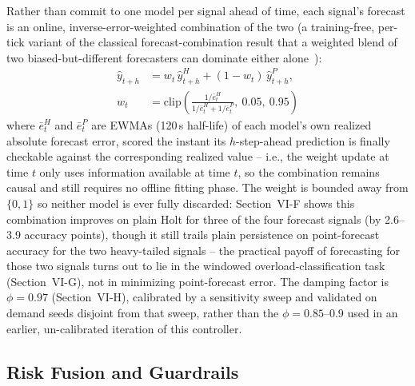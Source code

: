 \documentclass[conference]{IEEEtran}
\begin{document}
Rather than commit to one model per signal ahead of time, each signal's forecast is an online,
inverse-error-weighted combination of the two (a training-free, per-tick variant of the classical
forecast-combination result that a weighted blend of two biased-but-different forecasters can dominate
either alone~\cite{gardner1985}):
\begin{align}
\hat{y}_{t+h} &= w_t\, \hat{y}^{H}_{t+h} + (1-w_t)\, \hat{y}^{P}_{t+h}, \\
w_t &= \mathrm{clip}\!\left(\frac{1/\bar e^{H}_t}{1/\bar e^{H}_t + 1/\bar e^{P}_t},\ 0.05,\ 0.95\right)
\end{align}
where $\bar e^{H}_t$ and $\bar e^{P}_t$ are EWMAs (120\,s half-life) of each model's own realized
absolute forecast error, scored the instant its $h$-step-ahead prediction is finally checkable against
the corresponding realized value -- i.e., the weight update at time $t$ only uses information available
at time $t$, so the combination remains causal and still requires no offline fitting phase. The weight
is bounded away from $\{0,1\}$ so neither model is ever fully discarded: Section~VI-F shows this
combination improves on plain Holt for three of the four forecast signals (by 2.6--3.9 accuracy points),
though it still trails plain persistence on point-forecast accuracy for the two heavy-tailed signals --
the practical payoff of forecasting for those two signals turns out to lie in the windowed
overload-classification task (Section~VI-G), not in minimizing point-forecast error. The damping
factor is $\phi=0.97$ (Section~VI-H), calibrated by a sensitivity sweep and validated on demand seeds
disjoint from that sweep, rather than the $\phi=0.85$--$0.9$ used in an earlier, un-calibrated iteration
of this controller.

\subsection{Risk Fusion and Guardrails}
\end{document}
